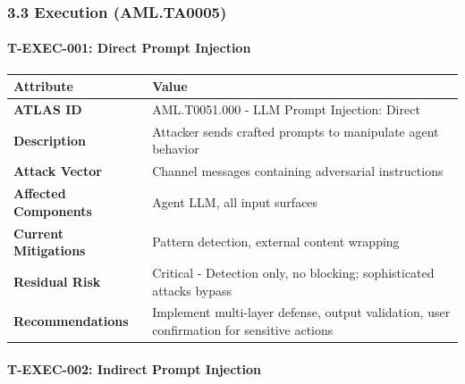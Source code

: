 \hrulefill


\subsubsection{3.3 Execution (AML.TA0005)}


\paragraph{T-EXEC-001: Direct Prompt Injection}



\begin{table}[h]
\centering
\small
\begin{tabular}{|l|l|}
\hline
Attribute & Value \\
\hline
\textbf{ATLAS ID} & AML.T0051.000 - LLM Prompt Injection: Direct \\
\hline
\textbf{Description} & Attacker sends crafted prompts to manipulate agent behavior \\
\hline
\textbf{Attack Vector} & Channel messages containing adversarial instructions \\
\hline
\textbf{Affected Components} & Agent LLM, all input surfaces \\
\hline
\textbf{Current Mitigations} & Pattern detection, external content wrapping \\
\hline
\textbf{Residual Risk} & Critical - Detection only, no blocking; sophisticated attacks bypass \\
\hline
\textbf{Recommendations} & Implement multi-layer defense, output validation, user confirmation for sensitive actions \\
\hline
\end{tabular}
\end{table}



\paragraph{T-EXEC-002: Indirect Prompt Injection}



